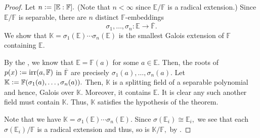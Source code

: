 \sepgaloisradical*\label{prop:sepgaloisradical2}
\begin{flushright}\hyperref[prop:sepgaloisradical]{\upsym}\end{flushright}
\begin{proof}
    Let $n \vcentcolon= [\mathbb{E} : \mathbb{F}].$ (Note that $n < \infty$ since $\mathbb{E}/\mathbb{F}$ is a radical extension.) Since $\mathbb{E}/\mathbb{F}$ is separable, there are $n$ distinct $\mathbb{F}$-embeddings
    \begin{equation*} 
        \sigma_1, \ldots, \sigma_n : \mathbb{E} \to \overline{\mathbb{F}}.
    \end{equation*}
    We show that $\mathbb{K} = \sigma_1(\mathbb{E}) \cdots \sigma_n(\mathbb{E})$ is the smallest Galois extension of $\mathbb{F}$ containing $\mathbb{E}.$

    By the , we know that $\mathbb{E} = \mathbb{F}(a)$ for some $a \in \mathbb{E}.$ Then, the roots of $p(x) \vcentcolon= \operatorname{irr}(a, \mathbb{F})$ in $\overline{\mathbb{F}}$ are precisely $\sigma_1(a), \ldots, \sigma_n(a).$ Let $\mathbb{K} \vcentcolon= \mathbb{F}(\sigma_1(a), \ldots, \sigma_n(a)).$ Then, $\mathbb{K}$ is a splitting field of a separable polynomial and hence, Galois over $\mathbb{K}.$ Moreover, it contains $\mathbb{E}.$ It is clear any such another field must contain $\mathbb{K}.$ Thus, $\mathbb{K}$ satisfies the hypothesis of the theorem.

    Note that we have $\mathbb{K} = \sigma_1(\mathbb{E}) \cdots \sigma_n(\mathbb{E}).$ Since $\sigma(\mathbb{E}_i) \cong \mathbb{E}_i,$ we see that each $\sigma(\mathbb{E}_i)/\mathbb{F}$ is a radical extension and thus, so is $\mathbb{K}/\mathbb{F},$ by .
\end{proof}

